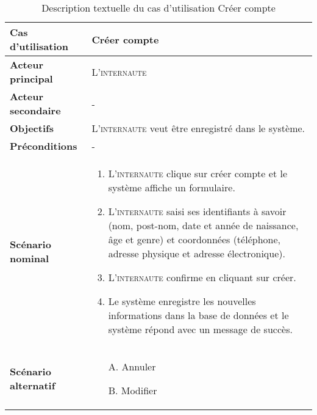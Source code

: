             \begin{longtable}{p{4cm} p{9cm}}
                \caption{Description textuelle du cas d’utilisation Créer compte}
                \label{table:usecaseCreeCompte}
                \\\hline\hline
                    \textbf{Cas d’utilisation} & \textbf{Créer compte}
                \\\hline\hline
                        \textbf{Acteur principal} & L’\textsc{internaute}
                    \\
                        \textbf{Acteur secondaire} & -
                    \\
                        \textbf{Objectifs} & L’\textsc{internaute} veut être 
                        enregistré dans le système.
                    \\
                        \textbf{Préconditions} & -
                    \\
                        \textbf{Scénario nominal} &
                            \begin{enumerate}[leftmargin=*]
                                \item L’\textsc{internaute} clique sur créer compte et le
                                système affiche un formulaire.
                                \item L’\textsc{internaute} saisi ses identifiants à savoir
                                (nom, post-nom, date et année de
                                naissance, âge et genre) et coordonnées (téléphone, adresse physique
                                et adresse électronique).
                                \item L’\textsc{internaute} confirme en cliquant sur créer.
                                \item Le système enregistre les nouvelles informations
                                dans la base de données et le
                                système répond avec un message de succès.
                            \end{enumerate}
                    \\
                        \textbf{Scénario alternatif} &
                            \begin{enumerate}[leftmargin=*]
                                \item [A.] Annuler
                                \item [B.] Modifier
                            \end{enumerate}

\end{longtable}
